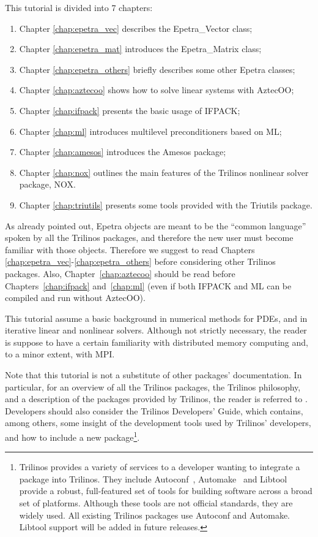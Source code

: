 This tutorial is divided into 7 chapters:
\begin{enumerate}
\item Chapter \ref{chap:epetra_vec} describes the Epetra\_Vector class;
\item Chapter \ref{chap:epetra_mat} introduces the Epetra\_Matrix
  class; 
\item Chapter \ref{chap:epetra_others} briefly describes some other
  Epetra classes;
\item Chapter \ref{chap:aztecoo} shows how to solve linear systems with
  AztecOO;
\item Chapter \ref{chap:ifpack} presents the basic usage of IFPACK;
\item Chapter \ref{chap:ml} introduces multilevel preconditioners based
  on ML;
\item Chapter \ref{chap:amesos} introduces the Amesos package;
\item Chapter \ref{chap:nox} outlines the main features of the Trilinos
  nonlinear solver package, NOX.
\item Chapter \ref{chap:triutils} presents some tools provided with the
  Triutils package. 
\end{enumerate}

\begin{remark}
  As already pointed out, Epetra objects are meant to be the ``common
  language'' spoken by all the Trilinos packages, and therefore the new
  user must become familiar with those objects. Therefore we suggest to
  read Chapters \ref{chap:epetra_vec}-\ref{chap:epetra_others} before
  considering other Trilinos packages. Also, Chapter~\ref{chap:aztecoo}
  should be read before Chapters~\ref{chap:ifpack} and~\ref{chap:ml}
  (even if both IFPACK and ML can be compiled and run without AztecOO).
\end{remark}

This tutorial assume a basic background in numerical methods for PDEs,
and in iterative linear and nonlinear solvers. Although not strictly
necessary, the reader is suppose to have a certain familiarity with
distributed memory computing and, to a minor extent, with MPI.

\smallskip

Note that this tutorial is not a substitute of other packages'
documentation. In particular, for an overview of all the Trilinos
packages, the Trilinos philosophy, and a description of the packages
provided by Trilinos, the reader is referred to
\cite{Trilinos-Overview}.  Developers should also consider the Trilinos
Developers' Guide, which contains, among others, some insight of the
development tools used by Trilinos' developers, and how to include a new
package\footnote{ Trilinos provides a variety of services to a developer
  wanting to integrate a package into Trilinos.  They include
  Autoconf~\cite{Autoconf}, Automake~\cite{Automake} and
  Libtool~\cite{Libtool} provide a robust, full-featured set of tools
  for building software across a broad set of platforms.  Although these
  tools are not official standards, they are widely used.  All existing
  Trilinos packages use Autoconf and Automake.  Libtool support will be
  added in future releases.}.

